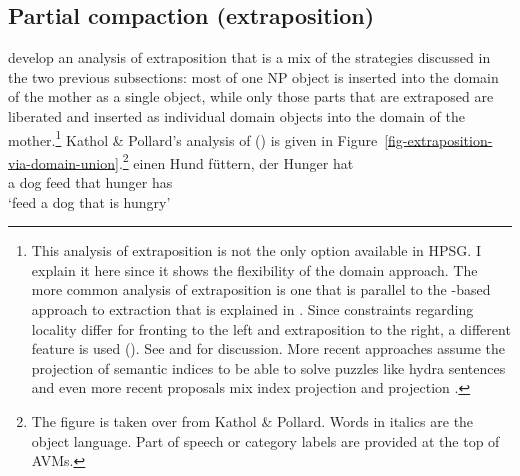 \documentclass[output=paper]{langsci/langscibook}
\begin{document}
\subsection{Partial compaction (extraposition)}
\label{sec-partial-compaction}

\citet{KP95a} develop an analysis of extraposition that is a mix of the strategies discussed in
the two previous subsections: most of one NP object is inserted into the domain of the mother as a single object, while only those
parts that are extraposed are liberated and inserted as individual domain objects into the domain of
the mother.\footnote{
  This analysis of extraposition is not the only option available in HPSG. I explain it here since
  it shows the flexibility of the domain approach. The more common analysis of extraposition is one
  that is parallel to the \slasch-based approach to extraction that is explained in
  . Since constraints regarding locality differ for fronting to the left and
  extraposition to the right, a different feature is used (). See  and
   for discussion. More recent approaches assume the
  projection of semantic indices \citep{Kiss2005a} to be able to solve puzzles like  hydra sentences and even more
  recent proposals mix index projection and \extra projection \citep{Crysmann2013a}.
}
Kathol \& Pollard's analysis of () is given in
Figure~\ref{fig-extraposition-via-domain-union}.\footnote{
  The figure is taken over from Kathol \& Pollard. Words in italics are the object language. Part of
  speech or category labels are provided at the top of AVMs.%
}
\ea
\label{ex-einen-hund-fuettern-der-hunger-hat}
\gll  einen Hund füttern, der Hunger hat\\
      a dog feed that hunger has\\\german
\glt `feed a dog that is hungry'
\z
\end{document}
